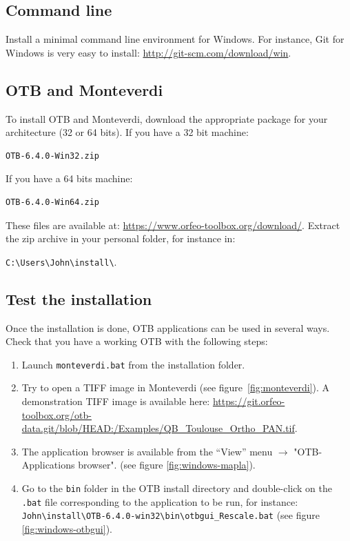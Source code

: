 \documentclass[10pt,a4paper]{article}
\begin{document}
\subsection{Command line}
Install a minimal command line environment for Windows. For instance, Git for
Windows is very easy to install: \url{http://git-scm.com/download/win}.

\subsection{OTB and Monteverdi}
To install OTB and Monteverdi, download the appropriate package for your
architecture (32 or 64 bits). If you have a 32 bit machine:

\begin{verbatim}
OTB-6.4.0-Win32.zip
\end{verbatim}

If you have a 64 bits machine:

\begin{verbatim}
OTB-6.4.0-Win64.zip
\end{verbatim}

These files are available at:
\url{https://www.orfeo-toolbox.org/download/}.
Extract the zip archive in your personal folder, for instance in:\\
\begin{centering}
\texttt{C:{\textbackslash}Users{\textbackslash}John{\textbackslash}install{\textbackslash}}.
\end{centering}

\subsection{Test the installation}
Once the installation is done, OTB applications can be used in several ways. Check that you have a working OTB with the following steps:
\begin{enumerate}

\item Launch \texttt{monteverdi.bat} from the installation folder.

\item Try to open a TIFF image in Monteverdi (see
figure~\ref{fig:monteverdi}). A demonstration TIFF image is available here: \url{https://git.orfeo-toolbox.org/otb-data.git/blob/HEAD:/Examples/QB\_Toulouse\_Ortho\_PAN.tif}.

\item The application browser is available from the ``View'' menu 
$\rightarrow$ "OTB-Applications browser".
(see figure \ref{fig:windows-mapla}).

\item Go to the \texttt{bin} folder in the OTB install directory and double-click on the \texttt{.bat} file corresponding to the application to be run, for instance:\\
\texttt{John{\textbackslash}install{\textbackslash}OTB-6.4.0-win32{\textbackslash}bin{\textbackslash}otbgui\_Rescale.bat}
(see figure \ref{fig:windows-otbgui}).

\end{enumerate}
\end{document}
